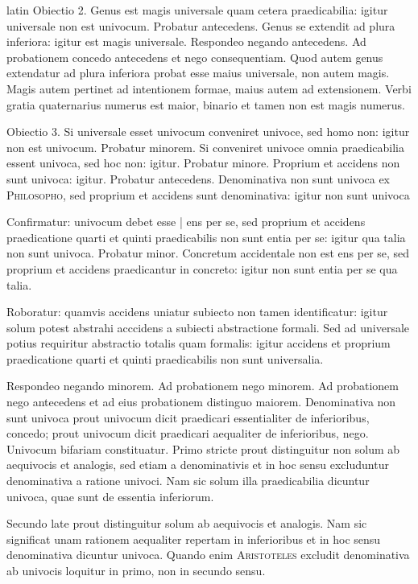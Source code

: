 \begin{otherlanguage*}{latin}
\pstart
Obiectio 2. Genus est magis universale quam cetera praedicabilia:
igitur universale non est univocum. Probatur antecedens. Genus se extendit ad plura inferiora:
igitur est magis universale. Respondeo negando antecedens. Ad probationem concedo antecedens et nego consequentiam. Quod autem genus extendatur ad plura inferiora probat esse maius universale, non autem magis. Magis autem pertinet ad intentionem formae, maius autem ad extensionem. Verbi gratia quaternarius numerus est maior, binario et tamen non est magis numerus. 
\pend

\pstart
Obiectio 3. Si universale esset univocum conveniret univoce, sed homo non:
igitur non est univocum. Probatur minorem. Si conveniret univoce omnia praedicabilia essent univoca, sed hoc non:
igitur. Probatur minore. Proprium et accidens non sunt univoca:
igitur. Probatur antecedens. Denominativa non sunt univoca ex \textsc{Philosopho}, sed proprium et accidens sunt denominativa:
igitur non sunt univoca 
\pend

\pstart
Confirmatur:
univocum debet esse \textnormal{|} ens per se, sed proprium et accidens praedicatione quarti et quinti praedicabilis non sunt entia per se:
igitur qua talia non sunt univoca. Probatur minor. Concretum accidentale non est ens per se, sed proprium et accidens praedicantur in concreto:
igitur non sunt entia per se qua talia. 
\pend

\pstart
Roboratur:
quamvis accidens uniatur subiecto non tamen identificatur:
igitur solum potest abstrahi acccidens a subiecti abstractione formali. Sed ad universale potius requiritur abstractio totalis quam formalis:
igitur accidens et proprium praedicatione quarti et quinti praedicabilis non sunt universalia. 
\pend

\pstart
Respondeo negando minorem. Ad probationem nego minorem. Ad probationem nego antecedens et ad eius probationem distinguo maiorem. Denominativa non sunt univoca prout univocum dicit praedicari essentialiter de inferioribus, concedo; prout univocum dicit praedicari aequaliter de inferioribus, nego. Univocum bifariam constituatur. Primo stricte prout distinguitur non solum ab aequivocis et analogis, sed etiam a denominativis et in hoc sensu excluduntur denominativa a ratione univoci. Nam sic solum illa praedicabilia dicuntur univoca, quae sunt de essentia inferiorum. 
\pend

\pstart
Secundo late prout distinguitur solum ab aequivocis et analogis. Nam sic significat unam rationem aequaliter repertam in inferioribus et in hoc sensu denominativa dicuntur univoca. Quando enim \textsc{Aristoteles} excludit denominativa ab univocis loquitur in primo, non in secundo sensu. 
\pend


\end{otherlanguage*}

